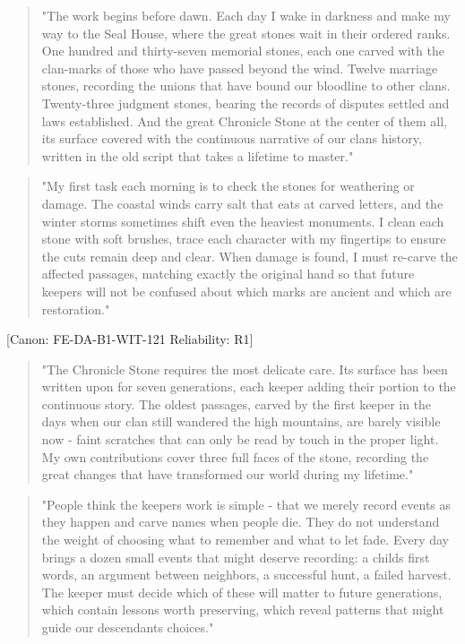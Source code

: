 \begin{quote}
"The work begins before dawn. Each day I wake in darkness and make my
way to the Seal House, where the great stones wait in their ordered
ranks. One hundred and thirty-seven memorial stones, each one carved
with the clan-marks of those who have passed beyond the wind. Twelve
marriage stones, recording the unions that have bound our bloodline to
other clans. Twenty-three judgment stones, bearing the records of
disputes settled and laws established. And the great Chronicle Stone at
the center of them all, its surface covered with the continuous
narrative of our clan\textquotesingle s history, written in the old
script that takes a lifetime to master."
\end{quote}

\begin{quote}
"My first task each morning is to check the stones for weathering or
damage. The coastal winds carry salt that eats at carved letters, and
the winter storms sometimes shift even the heaviest monuments. I clean
each stone with soft brushes, trace each character with my fingertips to
ensure the cuts remain deep and clear. When damage is found, I must
re-carve the affected passages, matching exactly the original hand so
that future keepers will not be confused about which marks are ancient
and which are restoration."
\end{quote}

{[}Canon: FE-DA-B1-WIT-121 \textbar{} Reliability: R1{]}

\begin{quote}
"The Chronicle Stone requires the most delicate care. Its surface has
been written upon for seven generations, each keeper adding their
portion to the continuous story. The oldest passages, carved by the
first keeper in the days when our clan still wandered the high
mountains, are barely visible now - faint scratches that can only be
read by touch in the proper light. My own contributions cover three full
faces of the stone, recording the great changes that have transformed
our world during my lifetime."
\end{quote}

\begin{quote}
"People think the keeper\textquotesingle s work is simple - that we
merely record events as they happen and carve names when people die.
They do not understand the weight of choosing what to remember and what
to let fade. Every day brings a dozen small events that might deserve
recording: a child\textquotesingle s first words, an argument between
neighbors, a successful hunt, a failed harvest. The keeper must decide
which of these will matter to future generations, which contain lessons
worth preserving, which reveal patterns that might guide our
descendants\textquotesingle{} choices."
\end{quote}

